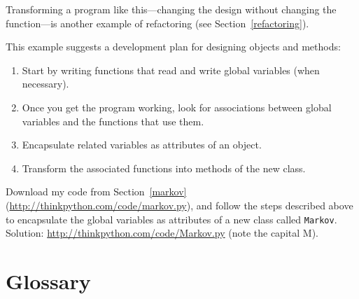 \documentclass[10pt]{book}
\begin{document}
Transforming a program like this---changing the design without
changing the function---is another example of refactoring
(see Section~\ref{refactoring}).

This example suggests a development plan for designing objects and
methods:

\begin{enumerate}

\item Start by writing functions that read and write global
variables (when necessary).

\item Once you get the program working, look for associations
between global variables and the functions that use them.

\item Encapsulate related variables as attributes of an object.

\item Transform the associated functions into methods of the new
class.

\end{enumerate}


\begin{exercise}

Download my code from Section~\ref{markov}
(\url{http://thinkpython.com/code/markov.py}), and follow the steps described
above to encapsulate the global variables as attributes of a new class
called {\tt Markov}.  Solution: \url{http://thinkpython.com/code/Markov.py}
(note the capital M).

\end{exercise}




\section{Glossary}
\end{document}
